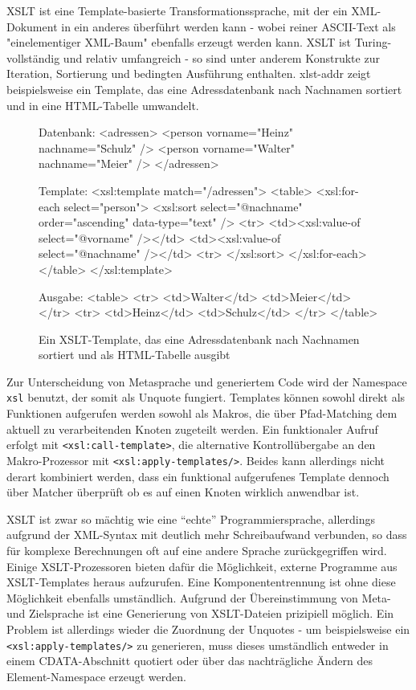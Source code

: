 \documentclass[11pt, a4paper, bibgerm]{book}
\newcommand\icode[1]{\lstinline?#1?}
\newcommand\abb{}
\begin{document}
XSLT ist eine Template-basierte Transformationssprache, mit der ein
XML-Dokument in ein anderes überführt werden kann - wobei reiner
ASCII-Text als "einelementiger XML-Baum" ebenfalls erzeugt werden
kann. XSLT ist Turing-vollständig und relativ umfangreich - so sind
unter anderem Konstrukte zur Iteration, Sortierung und bedingten
Ausführung enthalten. \abb{xlst-addr} zeigt beispielsweise ein Template,
das eine Adressdatenbank nach Nachnamen sortiert und in eine
HTML-Tabelle umwandelt.
\begin{figure}
  \centering
  \begin{code}
Datenbank:
<adressen>
  <person vorname="Heinz" nachname="Schulz" />
  <person vorname="Walter" nachname="Meier" />
</adressen>

Template:
<xsl:template match="/adressen">
  <table>
    <xsl:for-each select="person">
      <xsl:sort select="@nachname" order="ascending" data-type="text" />
        <tr>
          <td><xsl:value-of select="@vorname" /></td>
          <td><xsl:value-of select="@nachname" /></td>
        <tr>
      </xsl:sort>
    </xsl:for-each>
  </table>
</xsl:template>    

Ausgabe:
<table>
  <tr>
    <td>Walter</td>
    <td>Meier</td>
  </tr>
  <tr>
    <td>Heinz</td>
    <td>Schulz</td>
  </tr>
</table>    
  \end{code} %
  \caption{Ein XSLT-Template, das eine Adressdatenbank nach Nachnamen
    sortiert und als HTML-Tabelle ausgibt}
  \label{magicl:fig:xslt-addr}
\end{figure}
Zur Unterscheidung von Metasprache und generiertem Code wird der
Namespace \icode{xsl} benutzt, der somit als Unquote fungiert. Templates
können sowohl direkt als Funktionen aufgerufen werden sowohl als Makros,
die über Pfad-Matching dem aktuell zu verarbeitenden Knoten zugeteilt
werden. Ein funktionaler Aufruf erfolgt mit \icode{<xsl:call-template>},
die alternative Kontrollübergabe an den Makro-Prozessor mit
\icode{<xsl:apply-templates/>}. Beides kann allerdings nicht derart
kombiniert werden, dass ein funktional aufgerufenes Template dennoch
über Matcher überprüft ob es auf einen Knoten wirklich anwendbar ist.

XSLT ist zwar so mächtig wie eine "`echte"' Programmiersprache,
allerdings aufgrund der XML-Syntax mit deutlich mehr Schreibaufwand
verbunden, so dass für komplexe Berechnungen oft auf eine andere Sprache
zurückgegriffen wird. Einige XSLT-Prozessoren bieten dafür die
Möglichkeit, externe Programme aus XSLT-Templates heraus
aufzurufen. Eine Komponententrennung ist ohne diese Möglichkeit
ebenfalls umständlich. Aufgrund der Übereinstimmung von Meta- und
Zielsprache ist eine Generierung von XSLT-Dateien prizipiell
möglich. Ein Problem ist allerdings wieder die Zuordnung der Unquotes -
um beispielsweise ein \icode{<xsl:apply-templates/>} zu generieren, muss
dieses umständlich entweder in einem CDATA-Abschnitt quotiert oder über
das nachträgliche Ändern des Element-Namespace erzeugt werden.
\end{document}
